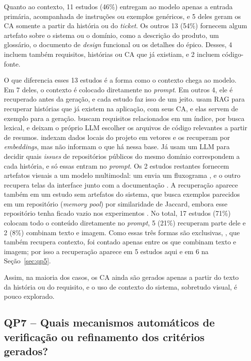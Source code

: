 Quanto ao contexto, 11 estudos (46\%) entregam ao modelo apenas a entrada primária, acompanhada de instruções ou exemplos genéricos, e 5 deles geram os CA somente a partir da história ou do \textit{ticket}. Os outros 13 (54\%) fornecem algum artefato sobre o sistema ou o domínio, como a descrição do produto, um glossário, o documento de \textit{design} funcional ou os detalhes do épico. Desses, 4 incluem também requisitos, histórias ou CA que já existiam, e 2 incluem código-fonte.

O que diferencia esses 13 estudos é a forma como o contexto chega ao modelo. Em 7 deles, o contexto é colocado diretamente no \textit{prompt}. Em outros 4, ele é recuperado antes da geração, e cada estudo faz isso de um jeito.  usam RAG para recuperar histórias que já existem na aplicação, com seus CA, e elas servem de exemplo para a geração.  buscam requisitos relacionados em um índice, por busca lexical, e deixam o próprio LLM escolher os arquivos de código relevantes a partir de resumos.  indexam dados locais do projeto em vetores e os recuperam por \textit{embeddings}, mas não informam o que há nessa base. Já  usam um LLM para decidir quais \textit{issues} de repositórios públicos do mesmo domínio correspondem a cada história, e só essas entram no \textit{prompt}. Os 2 estudos restantes fornecem artefatos visuais a um modelo multimodal: um envia um fluxograma \cite{zyberaj2026}, e o outro recupera telas da interface junto com a documentação \cite{wang2025}. A recuperação aparece também em um estudo sem artefatos do sistema, que busca exemplos parecidos em um repositório (\textit{memory pool}) por similaridade de Jaccard, embora esse repositório tenha ficado vazio nos experimentos \cite{zhang2025}. No total, 17 estudos (71\%) colocam todo o conteúdo diretamente no \textit{prompt}, 5 (21\%) recuperam parte dele e 2 (8\%) combinam texto e imagem. Como essas três formas são exclusivas, , que também recupera contexto, foi contado apenas entre os que combinam texto e imagem; por isso a recuperação aparece em 5 estudos aqui e em 6 na Seção~\ref{sec:qp5}.

Assim, na maioria dos casos, os CA ainda são gerados apenas a partir do texto da história ou do requisito, e o uso de contexto do sistema, sobretudo visual, é pouco explorado.

\subsection{QP7 -- Quais mecanismos automáticos de verificação ou refinamento dos critérios gerados?}
\label{sec:qp7}

